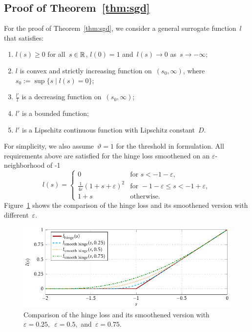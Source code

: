 \pagebreak

\subsection{Proof of Theorem~\ref{thm:sgd}}\label{app:sgd2}

For the proof of Theorem~\ref{thm:sgd}, we consider a general surrogate function~$l$ that satisfies:
\begin{enumerate}[label={(\textbf{S\arabic*})}, left = 15pt]
  \item \label{surr_basic1} $l(s)\geq 0$ for all~$s\in\mathbb{R}$, $l(0)=1$ and~$l(s)\to 0$ as~$s\to-\infty$;
  \item \label{surr_basic2} $l$ is convex and strictly increasing function on~$(s_0,\infty)$, where~$s_0:=\sup\{s \mid l(s)=0\}$;
  \item \label{surr_ratio} $\frac{l'}{l}$ is a decreasing function on~$(s_0,\infty)$;
  \item \label{surr_der1} $l'$ is a bounded function;
  \item \label{surr_der2} $l'$ is a Lipschitz continuous function with Lipschitz constant~$D$.
\end{enumerate}
For simplicity, we also assume~$\vartheta = 1$ for the threshold in \PatMat formulation. All requirements above are satisfied for the hinge loss smoothened on an $\varepsilon$-neighborhood of -1
\begin{equation*}
  l(s) = \begin{cases}
    0 & \text{for } s < -1 - \varepsilon, \\
    \frac{1}{4\varepsilon}(1 + s + \varepsilon)^2 & \text{for } - 1 - \varepsilon \leq s < - 1 + \varepsilon, \\
    1 + s & \text{otherwise.}
  \end{cases}
\end{equation*}
Figure~\ref{fig: surrogates smooth} shows the comparison of the hinge loss and its smoothened version with different~$\varepsilon.$

\begin{figure}[t]
  \centering
  \includegraphics[width = \linewidth]{images/surrogates_smooth.pdf}
  \caption{Comparison of the hinge loss and its smoothened version with~$\varepsilon = 0.25,$~$\varepsilon = 0.5,$ and~$\varepsilon = 0.75.$}
  \label{fig: surrogates smooth}
\end{figure}


